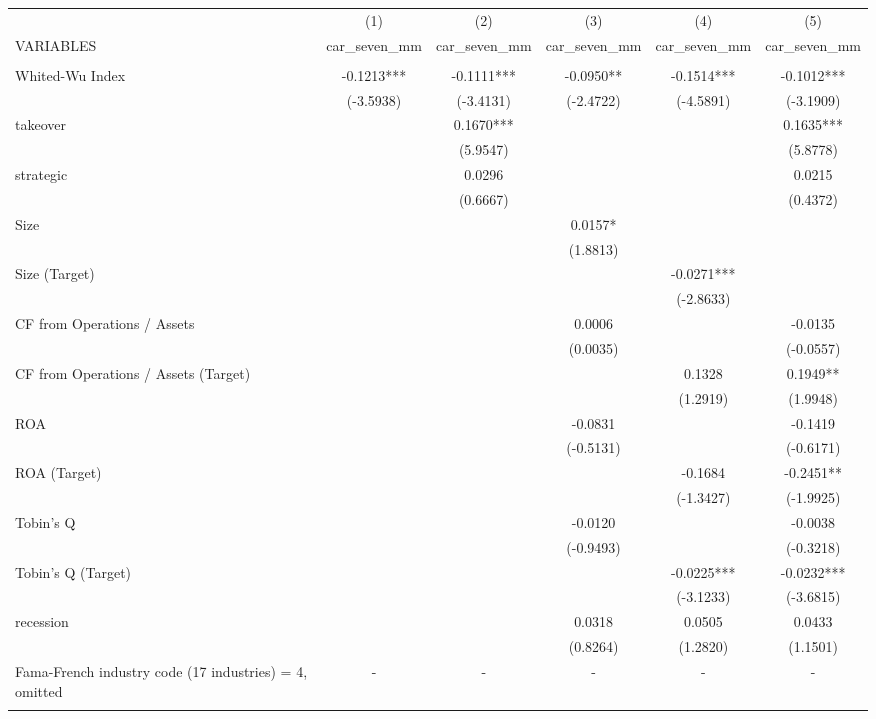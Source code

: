 \documentclass[12pt]{article}
\begin{document}
\begin{adjustbox}{max width=\textwidth}
   \begin{tabular}{lccccc} \hline
	& (1) & (2) & (3) & (4) & (5) \\
   VARIABLES & car\_seven\_mm & car\_seven\_mm & car\_seven\_mm & car\_seven\_mm & car\_seven\_mm \\ \hline
	&  &  &  &  &  \\
   Whited-Wu Index & -0.1213*** & -0.1111*** & -0.0950** & -0.1514*** & -0.1012*** \\
	& (-3.5938) & (-3.4131) & (-2.4722) & (-4.5891) & (-3.1909) \\
   takeover &  & 0.1670*** &  &  & 0.1635*** \\
	&  & (5.9547) &  &  & (5.8778) \\
   strategic &  & 0.0296 &  &  & 0.0215 \\
	&  & (0.6667) &  &  & (0.4372) \\
   Size &  &  & 0.0157* &  &  \\
	&  &  & (1.8813) &  &  \\
   Size (Target) &  &  &  & -0.0271*** &  \\
	&  &  &  & (-2.8633) &  \\
   CF from Operations / Assets &  &  & 0.0006 &  & -0.0135 \\
	&  &  & (0.0035) &  & (-0.0557) \\
   CF from Operations / Assets (Target) &  &  &  & 0.1328 & 0.1949** \\
	&  &  &  & (1.2919) & (1.9948) \\
   ROA &  &  & -0.0831 &  & -0.1419 \\
	&  &  & (-0.5131) &  & (-0.6171) \\
   ROA (Target) &  &  &  & -0.1684 & -0.2451** \\
	&  &  &  & (-1.3427) & (-1.9925) \\
   Tobin's Q &  &  & -0.0120 &  & -0.0038 \\
	&  &  & (-0.9493) &  & (-0.3218) \\
   Tobin's Q (Target) &  &  &  & -0.0225*** & -0.0232*** \\
	&  &  &  & (-3.1233) & (-3.6815) \\
   recession &  &  & 0.0318 & 0.0505 & 0.0433 \\
	&  &  & (0.8264) & (1.2820) & (1.1501) \\
   Fama-French industry code (17 industries) = 4, omitted & - & - & - & - & - \\
	&  &  &  &  &  \\

\end{tabular}
\end{adjustbox}
\end{document}
